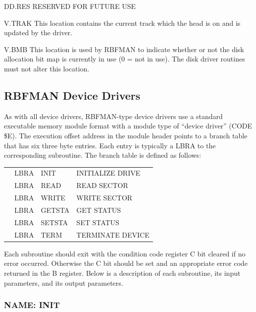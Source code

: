 \documentclass[
]{article}
\newcounter{none} %
\begin{document}
DD.RES RESERVED FOR FUTURE USE

V.TRAK This location contains the current track which the head is on and
is updated by the driver.

V.BMB This location is used by RBFMAN to indicate whether or not the
disk allocation bit map is currently in use (0 = not in use). The disk
driver routines must not alter this location.

\subsection{RBFMAN Device Drivers}

As with all device drivers, RBFMAN-type device drivers use a standard
executable memory module format with a module type of ``device driver''
(CODE \$E). The execution offset address in the module header points to
a branch table that has six three byte entries. Each entry is typically
a LBRA to the corresponding subroutine. The branch table is defined as
follows:

{\def\LTcaptype{none} %
\begin{longtable}[]{@{}
  >{\raggedright\arraybackslash}p{}
  >{\raggedright\arraybackslash}p{}
  >{\raggedright\arraybackslash}p{}
  >{\raggedright\arraybackslash}p{}@{}}
\toprule\noalign{}
\endhead
\bottomrule\noalign{}
\endlastfoot
\multirow{6}{=}{ENTRY} & LBRA & INIT & INITIALIZE DRIVE \\
& LBRA & READ & READ SECTOR \\
& LBRA & WRITE & WRITE SECTOR \\
& LBRA & GETSTA & GET STATUS \\
& LBRA & SETSTA & SET STATUS \\
& LBRA & TERM & TERMINATE DEVICE \\
\end{longtable}
}

Each subroutine should exit with the condition code register C bit
cleared if no error occurred. Otherwise the C bit should be set and an
appropriate error code returned in the B register. Below is a
description of each subroutine, its input parameters, and its output
parameters.

\subsubsection{NAME: INIT}
\end{document}
